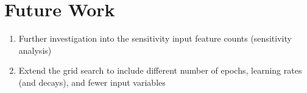 \chapter{Future Work}
\label{ch6}

\begin{enumerate}
	\item Further investigation into the sensitivity input feature counts (sensitivity analysis)
	\item Extend the grid search to include different number of epochs, learning rates (and decays), and fewer input variables
\end{enumerate}